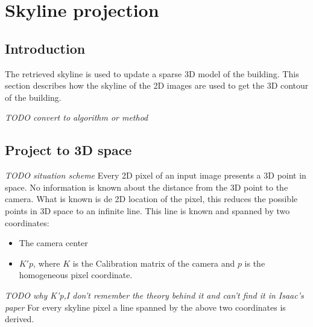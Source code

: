 \documentclass[10pt]{article}
\begin{document}
\section{Skyline projection}
 \subsection{Introduction}
The retrieved skyline is used to update a sparse 3D model of the building.
This section describes how the skyline of the 2D images are used to get the 3D contour of the building. 

\textit{TODO convert to algorithm or method }
 
\subsection{Project to 3D space}
\textit{ TODO situation scheme}
Every 2D pixel of an input image presents a 3D point in space. No
information is known about the distance from the 3D point to the camera. What
is known is de 2D location of the pixel, this reduces the possible points in 3D
space to an infinite line.  This line is known and spanned by two 
coordinates:\\ 
\begin{itemize}
	\item The camera center %
	\item $K'p$, where $K$ is the Calibration matrix of the camera and $p$ is the homogeneous pixel coordinate.
\end{itemize}

\textit{ TODO why K'p,I don't remember the theory behind it and can't find it in Isaac's paper }
For every skyline pixel a line spanned by the above two coordinates is derived.
\end{document}
